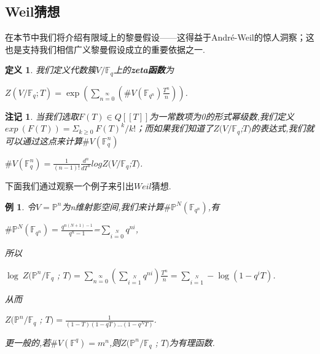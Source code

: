 \documentclass[11pt]{ctexart}
\newtheorem{defi}{定义}[section]
\newtheorem{rem}{注记}[section]
\newtheorem{exm}{例}[section]
\begin{document}
\subsection{Weil猜想}
在本节中我们将介绍有限域上的黎曼假设——这得益于André-Weil的惊人洞察；这也是支持我们相信广义黎曼假设成立的重要依据之一.
\begin{defi}我们定义代数簇$V/\mathbb{F}_q$上的\textbf{zeta函数}\label{zeta}为
    \begin{center}
        $Z(V/\mathbb{F}_q;T)=\exp(\sum\limits_{n=0}\limits^{\infty}(\#V(\mathbb{F}_{q^n})\frac{T^n}{n}))$.
    \end{center}
\end{defi}
\begin{rem}
    当我们选取$F(T)\in Q[[T]]$为一常数项为0的形式幂级数,我们定义$exp~(F(T))=\Sigma_{k\geqslant 0}~F(T)^k/k!$；而如果我们知道了$Z(V/\mathbb{F}_q$;$T)$的表达式,我们就可以通过这点来计算$\#V(\mathbb{F}_q^{n})$
    \begin{center}
        $\#V(\mathbb{F}_q^n)=\frac{1}{(n-1)!}\frac{d^n}{dT^n}logZ(V/\mathbb{F}_q$;$T)$.
    \end{center}

\end{rem}
\noindent 下面我们通过观察一个例子来引出$Weil$猜想.
\begin{exm}令$V=\mathbb{P}^n$为n维射影空间,我们来计算$\#\mathbb{P}^N(\mathbb{F}_{q^n})$,有
    \begin{center}
        $\#\mathbb{P}^N(\mathbb{F}_{q^n})=\frac{q^{n(N+1)-1}}{q^n-1}$=$\sum\limits_{i=0}\limits^{N}q^{ni}$,
    \end{center}
\noindent 所以
\begin{center}
    $\log~Z(\mathbb{P}^n/\mathbb{F}_q$ ; $T)=\sum\limits_{n=0}\limits^{\infty}(\sum\limits_{i=1}\limits^{N}q^{ni})\frac{T^n}{n}=\sum\limits_{i=1}\limits^{N}-\log(1-q^iT)$.
\end{center}
\noindent 从而
\begin{center}
   $ Z(\mathbb{P}^n/\mathbb{F}_q$ ; $T)=\frac{1}{(1-T)(1-qT)...(1-q^NT)}$.
\end{center}
\noindent 更一般的,若$\#V(\mathbb{F}^q)=m^n$,则$ Z(\mathbb{P}^n/\mathbb{F}_q$ ; $T)$为有理函数.

\end{exm}
\end{document}
